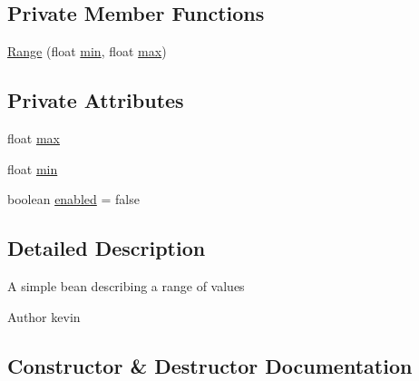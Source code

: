 \subsection*{Private Member Functions}
\begin{DoxyCompactItemize}
\item 
\mbox{\hyperlink{classorg_1_1newdawn_1_1slick_1_1particles_1_1_configurable_emitter_1_1_range_a4d18a3a619ba074f5edc300f5d916884}{Range}} (float \mbox{\hyperlink{classorg_1_1newdawn_1_1slick_1_1particles_1_1_configurable_emitter_1_1_range_a863382f93996d8d07cea741bea1fb9a9}{min}}, float \mbox{\hyperlink{classorg_1_1newdawn_1_1slick_1_1particles_1_1_configurable_emitter_1_1_range_a6950c49934d7424d5ab449b3b3256ec0}{max}})
\end{DoxyCompactItemize}
\subsection*{Private Attributes}
\begin{DoxyCompactItemize}
\item 
float \mbox{\hyperlink{classorg_1_1newdawn_1_1slick_1_1particles_1_1_configurable_emitter_1_1_range_a6950c49934d7424d5ab449b3b3256ec0}{max}}
\item 
float \mbox{\hyperlink{classorg_1_1newdawn_1_1slick_1_1particles_1_1_configurable_emitter_1_1_range_a863382f93996d8d07cea741bea1fb9a9}{min}}
\item 
boolean \mbox{\hyperlink{classorg_1_1newdawn_1_1slick_1_1particles_1_1_configurable_emitter_1_1_range_a8e14b5a19b817ff49fb52b9d3dd303ce}{enabled}} = false
\end{DoxyCompactItemize}


\subsection{Detailed Description}
A simple bean describing a range of values

\begin{DoxyAuthor}{Author}
kevin 
\end{DoxyAuthor}


\subsection{Constructor \& Destructor Documentation}
\mbox{\label{classorg_1_1newdawn_1_1slick_1_1particles_1_1_configurable_emitter_1_1_range_a4d18a3a619ba074f5edc300f5d916884}} 
